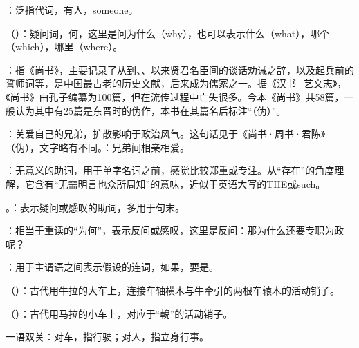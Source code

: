 {
\item {}：泛指代词，有人，someone。
\item {}（）：疑问词，何，这里是问为什么（why），也可以表示什么（what），哪个（which），哪里（where）。
\item {}：指《尚书》，主要记录了从到、、以来贤君名臣间的谈话劝诫之辞，以及起兵前的誓师词等，是中国最古老的历史文献，后来成为儒家之一。据《汉书·艺文志》，《尚书》由孔子编纂为100篇，但在流传过程中亡失很多。今本《尚书》共58篇，一般认为其中有25篇是东晋时的伪作，本书在其篇名后标注“（伪）”。
\item {}：关爱自己的兄弟，扩散影响于政治风气。这句话见于《尚书·周书·君陈》（伪），文字略有不同。：兄弟间相亲相爱。

：无意义的助词，用于单字名词之前，感觉比较郑重或专注。从“存在”的角度理解，它含有“无需明言也众所周知”的意味，近似于英语大写的THE或such。
\item {}。：表示疑问或感叹的助词，多用于句末。

：相当于重读的“为何”，表示反问或感叹，这里是反问：那为什么还要专职为政呢？
}
{}


{
\item {}：用于主谓语之间表示假设的连词，如果，要是。
\item {}（）：古代用牛拉的大车上，连接车轴横木与牛牵引的两根车辕木的活动销子。

（）：古代用马拉的小车上，对应于“輗”的活动销子。

\item {}一语双关：对车，指行驶；对人，指立身行事。
}
{}  %


